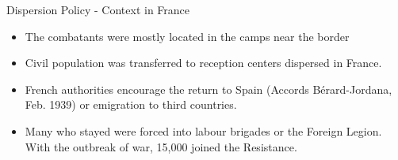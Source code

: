 \documentclass[xcolor=dvipsnames, aspectratio=169]{beamer}
\begin{document}
\begin{frame}{Dispersion Policy - Context in France}
\begin{itemize}
  \item The combatants were mostly located in the camps near the border
  \item Civil population was transferred to reception centers dispersed in France. 
  \vspace{0.1in}
  \item French authorities encourage the return to Spain (Accords Bérard-Jordana, Feb. 1939) or emigration to third countries.
  \vspace{0.2in}
  \item  Many who stayed were forced into labour brigades or the Foreign Legion. With the outbreak of war, 15,000 joined the Resistance. 
\end{itemize}




\end{frame}
\end{document}
